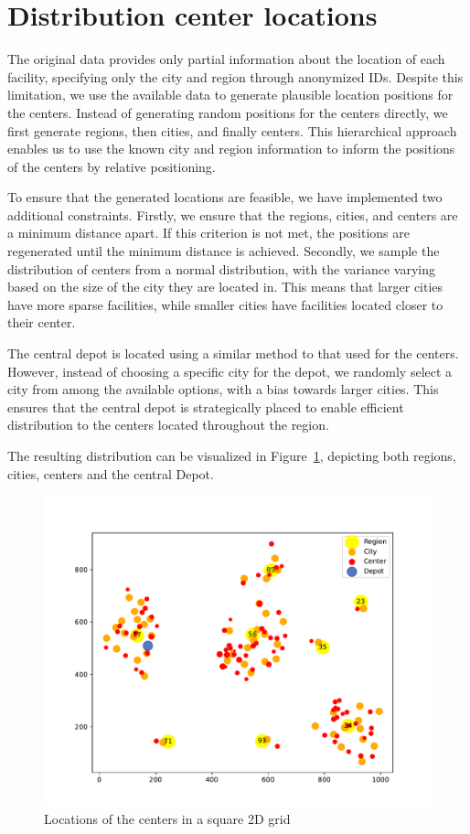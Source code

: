 \section{Distribution center locations}
\label{datagen-distribution-center-locations}
The original data provides only partial information about the location of each facility, specifying only the city and region through anonymized IDs. Despite this limitation, we use the available data to generate plausible location positions for the centers. Instead of generating random positions for the centers directly, we first generate regions, then cities, and finally centers. This hierarchical approach enables us to use the known city and region information to inform the positions of the centers by relative positioning.

To ensure that the generated locations are feasible, we have implemented two additional constraints. Firstly, we ensure that the regions, cities, and centers are a minimum distance apart. If this criterion is not met, the positions are regenerated until the minimum distance is achieved. Secondly, we sample the distribution of centers from a normal distribution, with the variance varying based on the size of the city they are located in. This means that larger cities have more sparse facilities, while smaller cities have facilities located closer to their center.

The central depot is located using a similar method to that used for the centers. However, instead of choosing a specific city for the depot, we randomly select a city from among the available options, with a bias towards larger cities. This ensures that the central depot is strategically placed to enable efficient distribution to the centers located throughout the region.

The resulting distribution can be visualized in Figure~\ref{fig:center_locations}, depicting both regions, cities, centers and the central Depot.


\begin{figure}[tb]
    \centering
    \includegraphics[width=1\columnwidth]{figures/center_locations.pdf}
    \caption{Locations of the centers in a square 2D grid}
  \label{fig:center_locations}
\end{figure}
